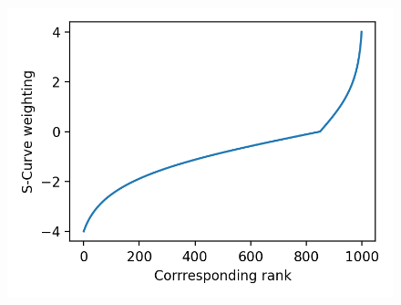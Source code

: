 \begin{figure}[!t]
  \vspace{0.5cm}

  \label{fig:s_curve_example}
  \includegraphics[width=0.9\linewidth]{img/s_curve_example.png}
\end{figure}
